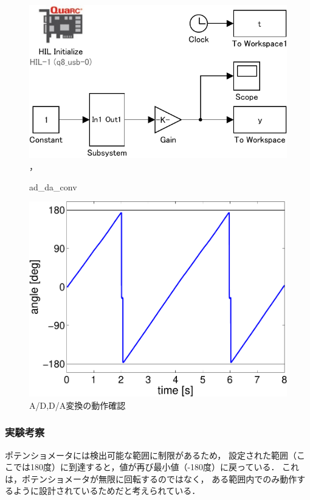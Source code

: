 \begin{figure}[h]
  \centering
  \includegraphics[scale=1]{sozai/ad_da_conv-crop.pdf}，
  \caption{ad\_da\_conv}
\end{figure}

\begin{figure}[h]
  \centering
  \includegraphics[scale=0.5]{sozai/figure_ad_da-crop.pdf}
  \caption{A/D,D/A変換の動作確認}
\end{figure}

\subsubsection{実験考察}
ポテンショメータには検出可能な範囲に制限があるため，
設定された範囲（ここでは180度）に到達すると，値が再び最小値（-180度）に戻っている．
これは，ポテンショメータが無限に回転するのではなく，
ある範囲内でのみ動作するように設計されているためだと考えられている．

